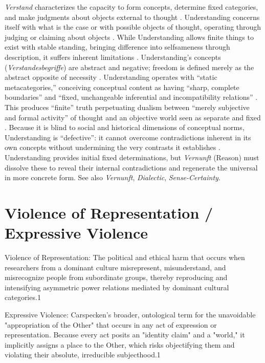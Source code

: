 \documentclass{book}
\begin{document}
\textit{Verstand} characterizes the capacity to form concepts, determine fixed categories, and make judgments about objects external to thought \parencite[para. 80--81]{hegel_georg_2010}. Understanding concerns itself with what is the case or with possible objects of thought, operating through judging or claiming about objects \parencite[para. 2]{hegel_georg_2010}. While Understanding allows finite things to exist with stable standing, bringing difference into selfsameness through description, it suffers inherent limitations \parencite[para. 245, 80A]{hegel_georg_2010}. Understanding's concepts (\textit{Verstandesbegriffe}) are abstract and negative; freedom is defined merely as the abstract opposite of necessity \parencite[para. 60]{hegel_georg_2010}. Understanding operates with ``static metacategories,'' conceiving conceptual content as having ``sharp, complete boundaries'' and ``fixed, unchangeable inferential and incompatibility relations'' \parencite[112--113]{Brandom:2019aa}. This produces ``finite'' truth perpetuating dualism between ``merely subjective and formal activity'' of thought and an objective world seen as separate and fixed \parencite[para. 226, 41A]{hegel_georg_2010}. Because it is blind to social and historical dimensions of conceptual norms, Understanding is ``defective'': it cannot overcome contradictions inherent in its own concepts without undermining the very contrasts it establishes \parencite{Brandom:2019aa}. Understanding provides initial fixed determinations, but \textit{Vernunft} (Reason) must dissolve these to reveal their internal contradictions and regenerate the universal in more concrete form. See also \textit{Vernunft}, \textit{Dialectic}, \textit{Sense-Certainty}.


\section{Violence of Representation / Expressive Violence}

\textit{}

Violence of Representation: The political and ethical harm that occurs when researchers from a dominant culture misrepresent, misunderstand, and misrecognize people from subordinate groups, thereby reproducing and intensifying asymmetric power relations mediated by dominant cultural categories.1

Expressive Violence: Carspecken's broader, ontological term for the unavoidable "appropriation of the Other" that occurs in any act of expression or representation. Because every act posits an "identity claim" and a "world," it implicitly assigns a place to the Other, which risks objectifying them and violating their absolute, irreducible subjecthood.1
\end{document}
